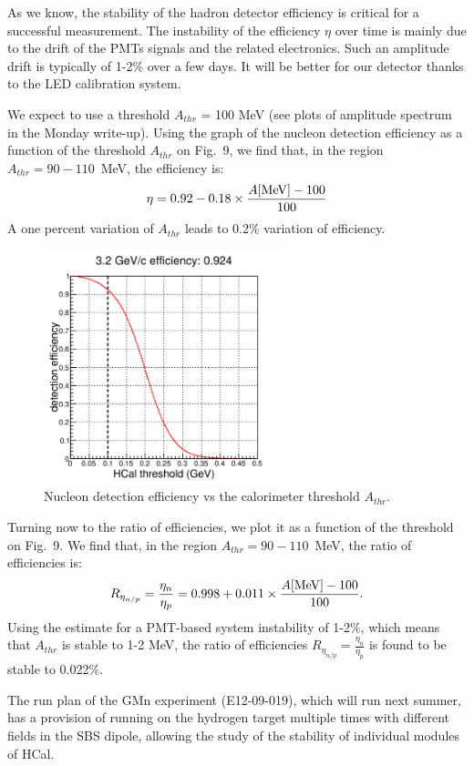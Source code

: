 As we know, the stability of the hadron detector efficiency is critical for a successful measurement.
The instability of the efficiency $\eta$ over time is mainly due to the drift of the PMTs signals and the related electronics.
Such an amplitude drift is typically of 1-2\% over a few days.
It will be better for our detector thanks to the LED calibration system.

We expect to use a threshold $A_{thr}$ = 100 MeV (see plots of amplitude spectrum in the Monday write-up).
Using the graph of the nucleon detection efficiency as a function of the threshold $A_{thr}$ on Fig.~9,%
we find that, in the region $A_{thr} = 90 - 110$~MeV, the efficiency is:
%
\begin{equation}
  \eta = 0.92 - 0.18 \times \frac{A[{\rm MeV}]-100}{100}
\end{equation}
%
A one percent variation of $A_{thr}$ leads to 0.2\% variation of efficiency.
%
\begin{figure}[!h]
  \centering
  \includegraphics[width=7cm]{Answers_Readers/Neff_fThr.pdf}
  \caption{Nucleon detection efficiency vs the calorimeter threshold $A_{thr}$.}
  \label{fig:eta_N}
\end{figure}
%

Turning now to the ratio of efficiencies, we plot it as a function of the threshold on Fig.~9.%
We find that, in the region $A_{thr} = 90 - 110$~MeV, the ratio of efficiencies is:
%
\begin{equation}
  R_{\eta_{n/p}} = \frac{\eta_n}{\eta_p} = 0.998 + 0.011 \times \frac{A[{\rm MeV}]-100}{100}.
\end{equation}
%
Using the estimate for a PMT-based system instability of 1-2\%, which means that $A_{thr}$ is stable to 1-2 MeV,
the ratio of efficiencies $R_{\eta_{n/p}} = \frac{\eta_n}{\eta_p}$ is found to be stable to 0.022\%.

The run plan of the GMn experiment (E12-09-019), which will run next summer,
has a provision of running on the hydrogen target multiple times with different fields in the SBS dipole,
allowing the study of the stability of individual modules of HCal.
